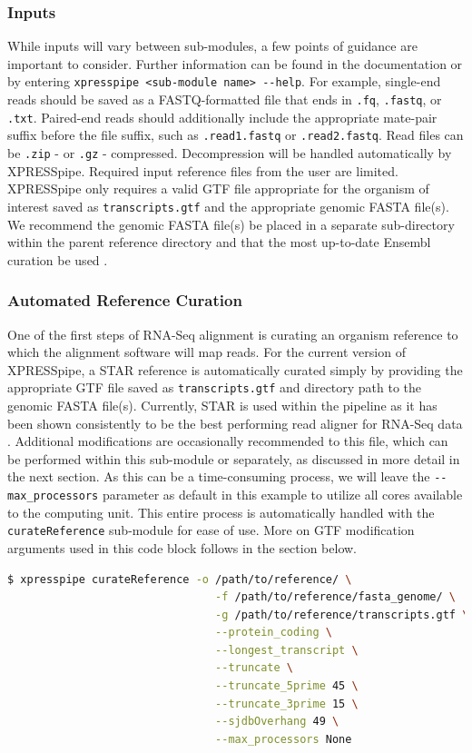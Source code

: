 \documentclass[10pt, oneside]{article}
\begin{document}
\subsubsection{Inputs}
While inputs will vary between sub-modules, a few points of guidance are important to consider. Further information can be found in the documentation \cite{documentation} or by entering \texttt{xpresspipe \textless sub-module name\textgreater \ -{}-help}. For example, single-end reads should be saved as a FASTQ-formatted file that ends in \texttt{.fq}, \texttt{.fastq}, or \texttt{.txt}. Paired-end reads should additionally include the appropriate mate-pair suffix before the file suffix, such as \texttt{.read1.fastq} or \texttt{.read2.fastq}. Read files can be \texttt{.zip} - or \texttt{.gz} - compressed. Decompression will be handled automatically by XPRESSpipe. Required input reference files from the user are limited. XPRESSpipe only requires a valid GTF file appropriate for the organism of interest saved as \texttt{transcripts.gtf} and the appropriate genomic FASTA file(s). We recommend the genomic FASTA file(s) be placed in a separate sub-directory within the parent reference directory and that the most up-to-date Ensembl curation be used \cite{ensembl}.


\subsubsection{Automated Reference Curation}
One of the first steps of RNA-Seq alignment is curating an organism reference to which the alignment software will map reads. For the current version of XPRESSpipe, a STAR \cite{star} reference is automatically curated simply by providing the appropriate GTF file saved as \texttt{transcripts.gtf} and directory path to the genomic FASTA file(s). Currently, STAR is used within the pipeline as it has been shown consistently to be the best performing read aligner for RNA-Seq data \cite{alignment_benchmark}. Additional modifications are occasionally recommended to this file, which can be performed within this sub-module or separately, as discussed in more detail in the next section. As this can be a time-consuming process, we will leave the \texttt{-{}-max\_processors} parameter as default in this example to utilize all cores available to the computing unit. This entire process is automatically handled with the \texttt{curateReference} sub-module for ease of use. More on GTF modification arguments used in this code block follows in the section below.
\newline
\begin{lstlisting}[language=bash, caption=curateReference example]
$ xpresspipe curateReference -o /path/to/reference/ \
                                -f /path/to/reference/fasta_genome/ \
                                -g /path/to/reference/transcripts.gtf \
                                --protein_coding \
                                --longest_transcript \
                                --truncate \
                                --truncate_5prime 45 \
                                --truncate_3prime 15 \
                                --sjdbOverhang 49 \
                                --max_processors None
\end{lstlisting}
\end{document}
